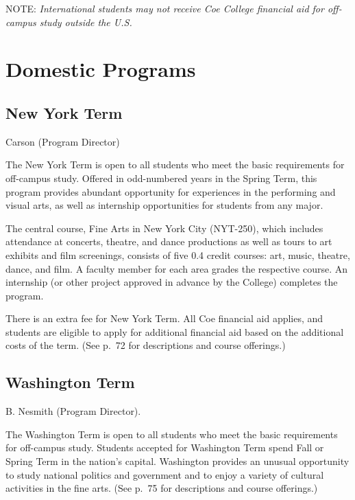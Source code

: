 \documentclass[
  letterpaper,
]{scrbook}
\begin{document}
NOTE: \emph{International students may not receive Coe College financial
aid for off-campus study outside the U.S.}

\hypertarget{domestic-programs}{%
\section{Domestic Programs}\label{domestic-programs}}

\hypertarget{new-york-term}{%
\subsection{New York Term}\label{new-york-term}}

Carson (Program Director)

The New York Term is open to all students who meet the basic
requirements for off-campus study. Offered in odd-numbered years in the
Spring Term, this program provides abundant opportunity for experiences
in the performing and visual arts, as well as internship opportunities
for students from any major.

The central course, Fine Arts in New York City (NYT-250), which includes
attendance at concerts, theatre, and dance productions as well as tours
to art exhibits and film screenings, consists of five 0.4 credit
courses: art, music, theatre, dance, and film. A faculty member for each
area grades the respective course. An internship (or other project
approved in advance by the College) completes the program.

There is an extra fee for New York Term. All Coe financial aid applies,
and students are eligible to apply for additional financial aid based on
the additional costs of the term. (See p.~72 for descriptions and course
offerings.)

\hypertarget{washington-term}{%
\subsection{Washington Term}\label{washington-term}}

B. Nesmith (Program Director).

The Washington Term is open to all students who meet the basic
requirements for off-campus study. Students accepted for Washington Term
spend Fall or Spring Term in the nation's capital. Washington provides
an unusual opportunity to study national politics and government and to
enjoy a variety of cultural activities in the fine arts. (See p.~75 for
descriptions and course offerings.)
\end{document}

